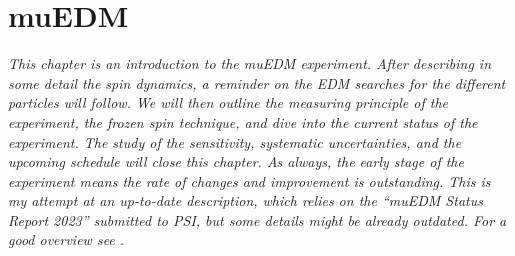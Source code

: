 \chapter{muEDM}
\label{ch:muEDM}
\begin{refsection}

{\itshape
This chapter is an introduction to the muEDM experiment. After describing in some detail the spin dynamics, a reminder on the EDM searches for the different particles will follow.
We will then outline the measuring principle of the experiment, the frozen spin technique, and dive into the current status of the experiment. 
The study of the sensitivity, systematic uncertainties, and the upcoming schedule will close this chapter. 
As always, the early stage of the experiment means the rate of changes and improvement is outstanding. 
This is my attempt at an up-to-date description, which relies on the ``muEDM Status Report 2023'' submitted to PSI, but some details might be already outdated. For a good overview see \cite{muEDM:PSI:2021}.}


\end{refsection}
